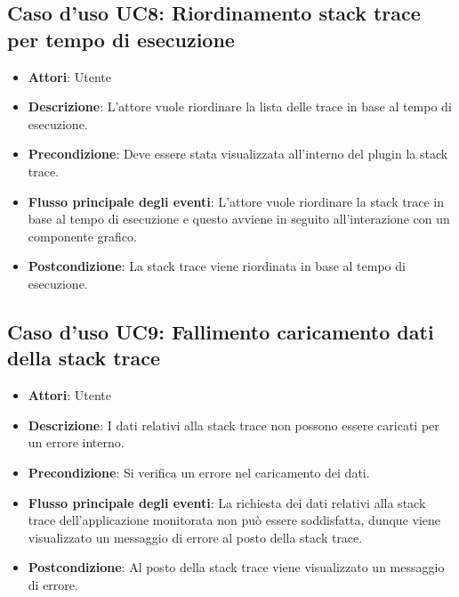 \subsection{Caso d'uso UC8: Riordinamento stack trace per tempo di esecuzione}
\begin{itemize}
	\item \textbf{Attori}: Utente
	\item \textbf{Descrizione}: L'attore vuole riordinare la lista delle trace in base al tempo di esecuzione.
	\item \textbf{Precondizione}: Deve essere stata visualizzata all'interno del plugin la stack trace.
	\item \textbf{Flusso principale degli eventi}: L'attore vuole riordinare la stack trace in base al tempo di esecuzione e questo avviene in seguito all'interazione con un componente grafico.
	\item \textbf{Postcondizione}: La stack trace viene riordinata in base al tempo di esecuzione.
\end{itemize}
\subsection{Caso d'uso UC9: Fallimento caricamento dati della stack trace}
\begin{itemize}
	\item \textbf{Attori}: Utente
	\item \textbf{Descrizione}: I dati relativi alla stack trace non possono essere caricati per un errore interno.
	\item \textbf{Precondizione}: Si verifica un errore nel caricamento dei dati.
	\item \textbf{Flusso principale degli eventi}: La richiesta dei dati relativi alla stack trace dell'applicazione monitorata non può essere soddisfatta, dunque viene visualizzato un messaggio di errore al posto della stack trace.
	\item \textbf{Postcondizione}: Al posto della stack trace viene visualizzato un messaggio di errore.
\end{itemize}
